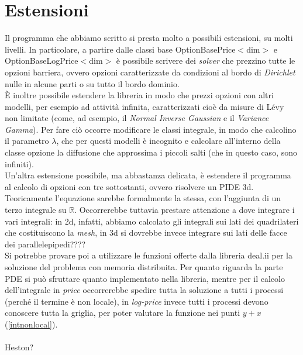 \documentclass[a4paper,10pt]{report}
\theoremstyle{plain}
\theoremstyle{definition}
\theoremstyle{remark}
\begin{document}
\chapter{Estensioni}
Il programma che abbiamo scritto si presta molto a possibili estensioni, su molti livelli. In particolare, a partire dalle classi base \textsf{OptionBasePrice$<$dim$>$} e \textsf{OptionBaseLogPrice$<$dim$>$} \`e possibile scrivere dei \emph{solver} che prezzino tutte le opzioni barriera, ovvero opzioni caratterizzate da condizioni al bordo di \emph{Dirichlet} nulle in alcune parti o su tutto il bordo dominio.\\\`E inoltre possibile estendere la libreria in modo che prezzi opzioni con altri modelli, per esempio ad attivit\`a infinita, caratterizzati cio\`e da misure di L\'evy non limitate (come, ad esempio, il \emph{Normal Inverse Gaussian} e il \emph{Variance Gamma}). Per fare ci\`o occorre modificare le classi integrale, in modo che calcolino il parametro $\lambda$, che per questi modelli \`e incognito e calcolare all'interno della classe opzione la diffusione che approssima i piccoli salti (che in questo caso, sono infiniti).\\Un'altra estensione possibile, ma abbastanza delicata, \`e estendere il programma al calcolo di opzioni con tre sottostanti, ovvero risolvere un PIDE 3d. Teoricamente l'equazione sarebbe formalmente la stessa, con l'aggiunta di un terzo integrale su $\mathbb{R}$. Occorrerebbe tuttavia prestare attenzione a dove integrare i vari integrali: in 2d, infatti, abbiamo calcolato gli integrali sui lati dei quadrilateri che costituiscono la \emph{mesh}, in 3d si dovrebbe invece integrare sui lati delle facce dei parallelepipedi????\\Si potrebbe provare poi a utilizzare le funzioni offerte dalla libreria \textsf{deal.ii} per la soluzione del problema con memoria distribuita. Per quanto riguarda la parte PDE si pu\`o sfruttare quanto implementato nella libreria, mentre per il calcolo dell'integrale in \emph{price} occorrerebbe spedire tutta la soluzione a tutti i processi (perch\'e il termine \`e non locale), in \emph{log-price} invece tutti i processi devono conoscere tutta la griglia, per poter valutare la funzione nei punti $y+x$ (\ref{intnonlocal}).\\\\
Heston?
\clearpage
{}


\end{document}
